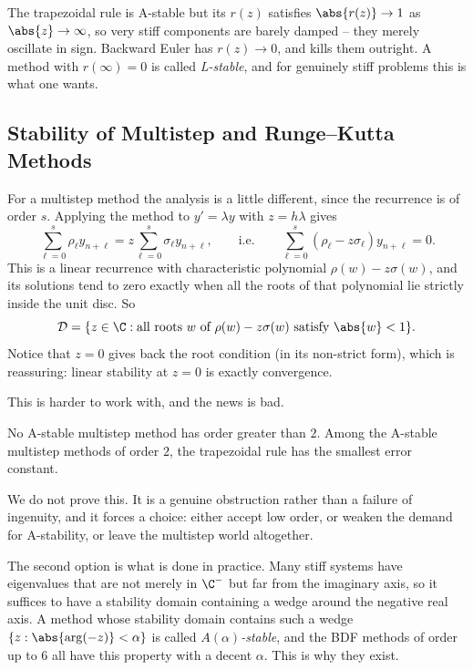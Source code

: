 \begin{remark}
  The trapezoidal rule is A-stable but its $r(z)$ satisfies $\abs{r(z)} \to 1$ as $\abs{z}\to\infty$, so very stiff components are barely damped -- they merely oscillate in sign. Backward Euler has $r(z) \to 0$, and kills them outright. A method with $r(\infty) = 0$ is called \emph{L-stable}, and for genuinely stiff problems this is what one wants.
\end{remark}

\subsection{Stability of Multistep and Runge--Kutta Methods}

For a multistep method the analysis is a little different, since the recurrence is of order $s$. Applying the method to $y' = \lambda y$ with $z = h\lambda$ gives
$$
\sum_{\ell=0}^{s}\rho_\ell y_{n+\ell} = z\sum_{\ell=0}^s \sigma_\ell y_{n+\ell}, \qquad \text{i.e.}\qquad \sum_{\ell=0}^s (\rho_\ell - z\sigma_\ell)y_{n+\ell} = 0.
$$
This is a linear recurrence with characteristic polynomial $\rho(w) - z\sigma(w)$, and its solutions tend to zero exactly when all the roots of that polynomial lie strictly inside the unit disc. So
$$
\mathcal{D} = \{z \in \C : \text{all roots } w \text{ of } \rho(w) - z\sigma(w) \text{ satisfy } \abs{w} < 1\}.
$$
Notice that $z = 0$ gives back the root condition (in its non-strict form), which is reassuring: linear stability at $z = 0$ is exactly convergence.

This is harder to work with, and the news is bad.

\begin{theorem}
  No A-stable multistep method has order greater than $2$. Among the A-stable multistep methods of order $2$, the trapezoidal rule has the smallest error constant.
\end{theorem}

We do not prove this. It is a genuine obstruction rather than a failure of ingenuity, and it forces a choice: either accept low order, or weaken the demand for A-stability, or leave the multistep world altogether.

The second option is what is done in practice. Many stiff systems have eigenvalues that are not merely in $\C^-$ but far from the imaginary axis, so it suffices to have a stability domain containing a wedge around the negative real axis. A method whose stability domain contains such a wedge $\{z : \abs{\arg(-z)} < \alpha\}$ is called \emph{$A(\alpha)$-stable}, and the BDF methods of order up to $6$ all have this property with a decent $\alpha$. This is why they exist.

